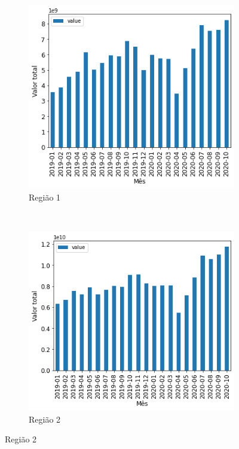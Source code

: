 \begin{figure}[htb] 
    \centering 
    \caption{Quantidade mensal de transações por região no período analisado}
    \label{fig:pandemia:descritiva-12-valor-mensal-por-regiao} 
    \begin{subfigure}[b]{0.45\textwidth}
        \includegraphics[scale=0.45]{images/base-de-dados-12.1-valor-mensal-por-regiao.png}
        \caption{Região 1}
        \label{fig:pandemia:descritiva-12.1-valor-mensal-por-regiao}
    \end{subfigure} ~ \quad
    \begin{subfigure}[b]{0.45\textwidth}
        \includegraphics[scale=0.45]{images/base-de-dados-12.2-valor-mensal-por-regiao.png}
        \caption{Região 2}
        \label{fig:pandemia:descritiva-12.2-valor-mensal-por-regiao}

\end{subfigure}
\end{figure}
